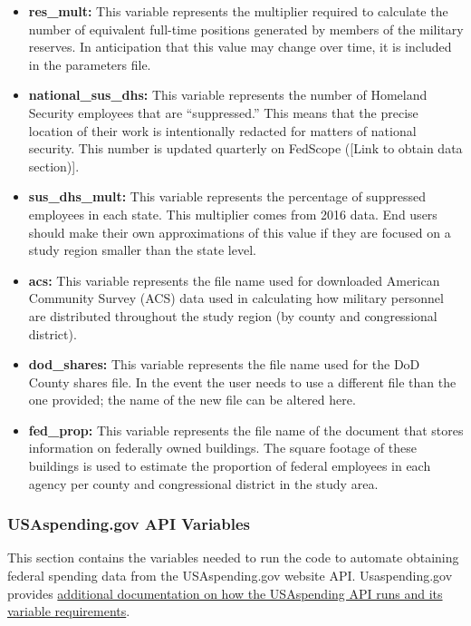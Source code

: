 \documentclass[
]{book}
\providecommand{\tightlist}{%
  \setlength{\itemsep}{0pt}\setlength{\parskip}{0pt}}
\begin{document}
\begin{itemize}
\tightlist
\item
  \textbf{res\_mult:} This variable represents the multiplier required to calculate the number of equivalent full-time positions generated by members of the military reserves. In anticipation that this value may change over time, it is included in the parameters file.\\
\item
  \textbf{national\_sus\_dhs:} This variable represents the number of Homeland Security employees that are ``suppressed.'' This means that the precise location of their work is intentionally redacted for matters of national security. This number is updated quarterly on FedScope ({[}Link to obtain data section){]}.
\item
  \textbf{sus\_dhs\_mult:} This variable represents the percentage of suppressed employees in each state. This multiplier comes from 2016 data. End users should make their own approximations of this value if they are focused on a study region smaller than the state level.
\item
  \textbf{acs:} This variable represents the file name used for downloaded American Community Survey (ACS) data used in calculating how military personnel are distributed throughout the study region (by county and congressional district).\\
\item
  \textbf{dod\_shares:} This variable represents the file name used for the DoD County shares file. In the event the user needs to use a different file than the one provided; the name of the new file can be altered here.\\
\item
  \textbf{fed\_prop:} This variable represents the file name of the document that stores information on federally owned buildings. The square footage of these buildings is used to estimate the proportion of federal employees in each agency per county and congressional district in the study area.
\end{itemize}

\hypertarget{usa-api}{%
\subsubsection{USAspending.gov API Variables}\label{usa-api}}

This section contains the variables needed to run the code to automate obtaining federal spending data from the USAspending.gov website API. Usaspending.gov provides \href{https://github.com/fedspendingtransparency/usaspending-api/blob/master/usaspending_api/api_contracts/contracts/v2/bulk_download/awards.md}{additional documentation on how the USAspending API runs and its variable requirements}.
\end{document}
